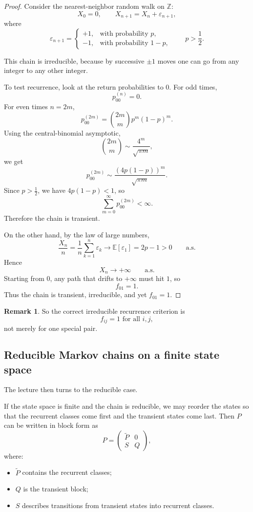\documentclass[11pt]{article}
\theoremstyle{definition}
\newtheorem{remark}[theorem]{Remark}
\begin{document}
\begin{proof}
Consider the nearest-neighbor random walk on \(\mathbb Z\):
\[
X_0=0,
\qquad
X_{n+1}=X_n+\varepsilon_{n+1},
\]
where
\[
\varepsilon_{n+1}=
\begin{cases}
+1, & \text{with probability } p,\\[0.3em]
-1, & \text{with probability } 1-p,
\end{cases}
\qquad p>\frac12.
\]

This chain is irreducible, because by successive \(\pm 1\) moves one can go from any integer to any other integer.

To test recurrence, look at the return probabilities to \(0\). For odd times,
\[
p_{00}^{(n)}=0.
\]
For even times \(n=2m\),
\[
p_{00}^{(2m)}
=
\binom{2m}{m}p^m(1-p)^m.
\]
Using the central-binomial asymptotic,
\[
\binom{2m}{m}\sim \frac{4^m}{\sqrt{\pi m}},
\]
we get
\[
p_{00}^{(2m)}
\sim
\frac{(4p(1-p))^m}{\sqrt{\pi m}}.
\]
Since \(p>\frac12\), we have \(4p(1-p)<1\), so
\[
\sum_{m=0}^{\infty} p_{00}^{(2m)}<\infty.
\]
Therefore the chain is transient.

On the other hand, by the law of large numbers,
\[
\frac{X_n}{n}
=
\frac1n\sum_{k=1}^n \varepsilon_k
\longrightarrow
\mathbb E[\varepsilon_1]
=
2p-1
>
0
\qquad \text{a.s.}
\]
Hence
\[
X_n\to +\infty
\qquad \text{a.s.}
\]
Starting from \(0\), any path that drifts to \(+\infty\) must hit \(1\), so
\[
f_{01}=1.
\]
Thus the chain is transient, irreducible, and yet \(f_{01}=1\).
\end{proof}

\begin{remark}
So the correct irreducible recurrence criterion is
\[
f_{ij}=1 \text{ for all } i,j,
\]
not merely for one special pair.
\end{remark}

\subsection{Reducible Markov chains on a finite state space}

The lecture then turns to the reducible case.

If the state space is finite and the chain is reducible, we may reorder the states so that the recurrent classes come first and the transient states come last. Then \(P\) can be written in block form as
\[
P=
\begin{pmatrix}
\widetilde P & 0\\
S & Q
\end{pmatrix},
\]
where:
\begin{itemize}[leftmargin=2em]
    \item \(\widetilde P\) contains the recurrent classes;
    \item \(Q\) is the transient block;
    \item \(S\) describes transitions from transient states into recurrent classes.
\end{itemize}
\end{document}

